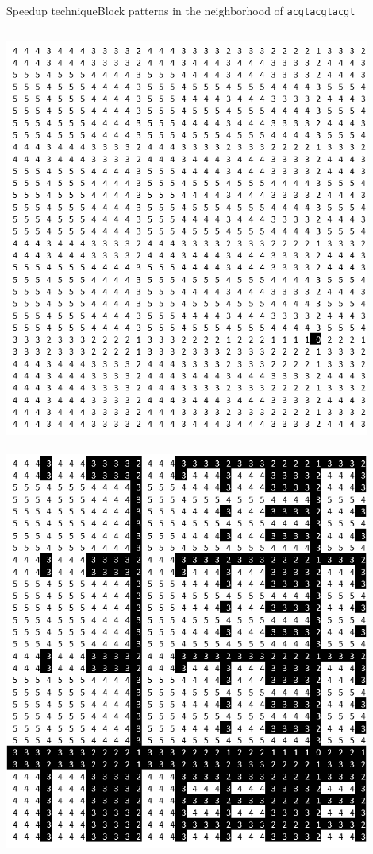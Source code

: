 \documentclass[pdf,xcolor={dvipsnames}]{beamer}
\begin{document}
	\begin{frame}{Speedup technique}{Block patterns in the neighborhood of \texttt{acgtacgtacgt}}
		\begin{columns}
			\begin{column}{0.33\textwidth}
				\includegraphics[width=0.9\textwidth]{img/0.png}\\\ \\
				\includegraphics[width=0.9\textwidth]{img/3.png}

\end{column}
\end{columns}
\end{frame}
\end{document}
